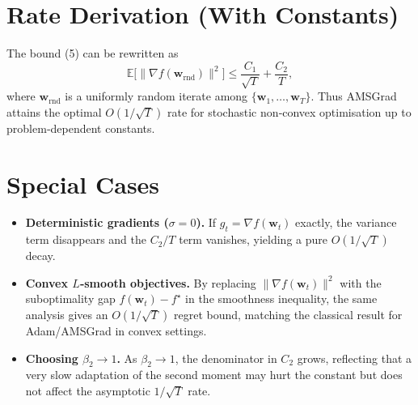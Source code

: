 \documentclass{article}
\begin{document}
\section*{Rate Derivation (With Constants)}
The bound (5) can be rewritten as
\[
\mathbb{E}\big[\|\nabla f(\mathbf{w}_{\text{rnd}})\|^2\big]
\le \frac{C_1}{\sqrt{T}}+\frac{C_2}{T},
\]
where $\mathbf{w}_{\text{rnd}}$ is a uniformly random iterate among $\{\mathbf{w}_1,\dots,\mathbf{w}_T\}$.
Thus AMSGrad attains the optimal $O(1/\sqrt{T})$ rate for stochastic non‑convex optimisation up to problem‑dependent constants.

\section*{Special Cases}
\begin{itemize}
\item \textbf{Deterministic gradients ($\sigma=0$).} If $g_t=\nabla f(\mathbf{w}_t)$ exactly, the variance term disappears and the $C_2/T$ term vanishes, yielding a pure $O(1/\sqrt{T})$ decay.
\item \textbf{Convex $L$‑smooth objectives.} By replacing $\|\nabla f(\mathbf{w}_t)\|^2$ with the suboptimality gap $f(\mathbf{w}_t)-f^{\star}$ in the smoothness inequality, the same analysis gives an $O(1/\sqrt{T})$ regret bound, matching the classical result for Adam/AMSGrad in convex settings.
\item \textbf{Choosing $\beta_2\to1$.} As $\beta_2\to1$, the denominator in $C_2$ grows, reflecting that a very slow adaptation of the second moment may hurt the constant but does not affect the asymptotic $1/\sqrt{T}$ rate.
\end{itemize}
\end{document}
